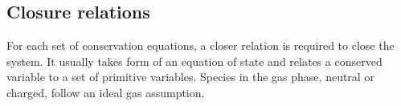 \subsection{Closure relations}
For each set of conservation equations, a closer relation is required to close the system. It usually takes form of an equation of state and relates a conserved variable to a set of primitive variables. Species in
the gas phase, neutral or charged, follow an ideal gas assumption.
